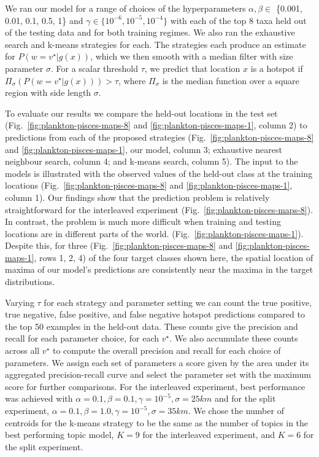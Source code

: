 We ran our model for a range of choices of the hyperparameters $\alpha, \beta \in$ \{0.001, 0.01, 0.1, 0.5, 1\} and $\gamma \in \{10^{-6},10^{-5},10^{-4}\}$ with each of the top 8 taxa held out of the testing data and for both training regimes. We also ran the exhaustive search and k-means strategies for each. The strategies each produce an estimate for $P(w=v^\star | g(x))$, which we then smooth with a median filter with size parameter $\sigma$. For a scalar threshold $\tau$, we predict that location $x$ is a hotspot if $\Pi_\sigma(P(w=v^\star | g(x))) > \tau$, where $\Pi_\sigma$ is the median function over a square region with side length $\sigma$. 

To evaluate our results we compare the held-out locations in the test set (Fig.~\ref{fig:plankton-pisces-maps-8} and \ref{fig:plankton-pisces-maps-1}, column 2) to predictions from each of the proposed strategies (Fig.~\ref{fig:plankton-pisces-maps-8} and \ref{fig:plankton-pisces-maps-1}, our model, column 3; exhaustive nearest neighbour search, column 4; and k-means search, column 5). The input to the models is illustrated with the observed values of the held-out class at the training locations (Fig.~\ref{fig:plankton-pisces-maps-8} and \ref{fig:plankton-pisces-maps-1}, column 1). Our findings show that the prediction problem is relatively straightforward for the interleaved experiment (Fig.~\ref{fig:plankton-pisces-maps-8}). In contrast, the problem is much more difficult when training and testing locations are in different parts of the world. (Fig.~\ref{fig:plankton-pisces-maps-1}). Despite this, for three (Fig.~\ref{fig:plankton-pisces-maps-8} and \ref{fig:plankton-pisces-maps-1}, rows 1, 2, 4) of the four target classes shown here, the spatial location of maxima of our model's predictions are consistently near the maxima in the target distributions.

Varying $\tau$ for each strategy and parameter setting we can count the true positive, true negative, false positive, and false negative hotspot predictions compared to the top 50 examples in the held-out data. These counts give the precision and recall for each parameter choice, for each $v^\star$. We also accumulate these counts across all $v^\star$ to compute the overall precision and recall for each choice of parameters. We assign each set of parameters a score given by the area under its aggregated precision-recall curve and select the parameter set with the maximum score for further comparisons. For the interleaved experiment, best performance was achieved with $\alpha=0.1, \beta=0.1, \gamma=10^{-5}, \sigma=25 km$ and for the split experiment, $\alpha=0.1, \beta=1.0, \gamma=10^{-5},\sigma=35 km$. We chose the number of centroids for the k-means strategy to be the same as the number of topics in the best performing topic model, $K=9$ for the interleaved experiment, and $K=6$ for the split experiment.

